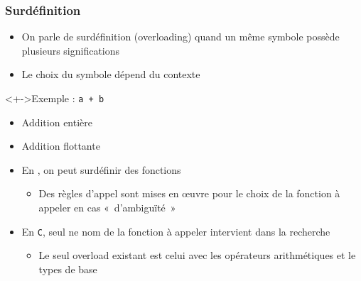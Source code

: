\begin{frame}
\frametitle{Surdéfinition}
\begin{itemize}[<+->]
\item On parle de surdéfinition (overloading) quand un même symbole possède plusieurs significations
\item Le choix du symbole dépend du contexte
\end{itemize}
\begin{exampleblock}<+->{Exemple : \texttt{a + b}}
	\begin{itemize}[<+->]
	\item Addition entière
	\item Addition flottante
	\end{itemize}
\end{exampleblock}
\begin{itemize}[<+->]
\item En \cpp, on peut surdéfinir des fonctions
	\begin{itemize}
	\item Des règles d'appel sont mises en œuvre pour le choix de la fonction à appeler en cas «~d'ambiguïté~»
	\end{itemize}
\item En \texttt{C}, seul ne nom de la fonction à appeler intervient dans la recherche
	\begin{itemize}
	\item Le seul overload existant est celui avec les opérateurs arithmétiques et le types de base
	\end{itemize}
\end{itemize}
\end{frame}

